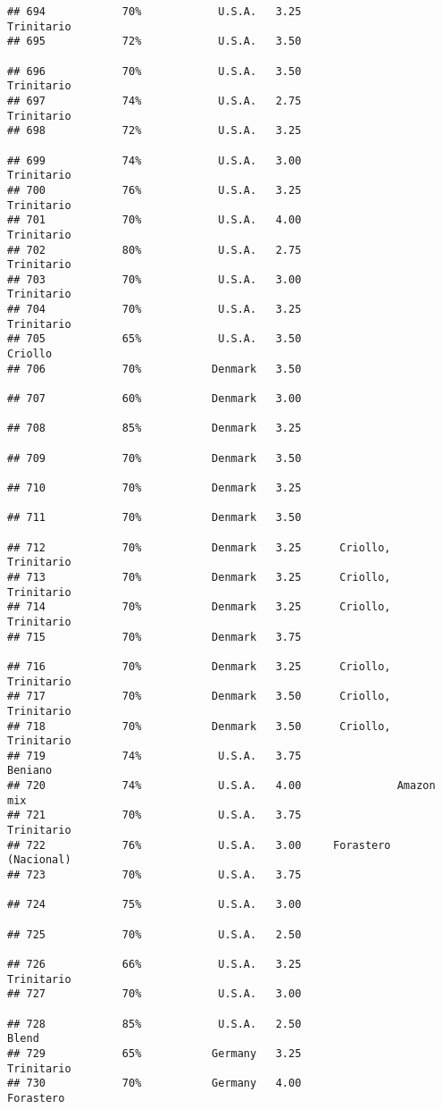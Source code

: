\documentclass[
]{article}
\begin{document}
\begin{verbatim}
## 694            70%            U.S.A.   3.25               Trinitario
## 695            72%            U.S.A.   3.50                         
## 696            70%            U.S.A.   3.50               Trinitario
## 697            74%            U.S.A.   2.75               Trinitario
## 698            72%            U.S.A.   3.25                         
## 699            74%            U.S.A.   3.00               Trinitario
## 700            76%            U.S.A.   3.25               Trinitario
## 701            70%            U.S.A.   4.00               Trinitario
## 702            80%            U.S.A.   2.75               Trinitario
## 703            70%            U.S.A.   3.00               Trinitario
## 704            70%            U.S.A.   3.25               Trinitario
## 705            65%            U.S.A.   3.50                  Criollo
## 706            70%           Denmark   3.50                         
## 707            60%           Denmark   3.00                         
## 708            85%           Denmark   3.25                         
## 709            70%           Denmark   3.50                         
## 710            70%           Denmark   3.25                         
## 711            70%           Denmark   3.50                         
## 712            70%           Denmark   3.25      Criollo, Trinitario
## 713            70%           Denmark   3.25      Criollo, Trinitario
## 714            70%           Denmark   3.25      Criollo, Trinitario
## 715            70%           Denmark   3.75                         
## 716            70%           Denmark   3.25      Criollo, Trinitario
## 717            70%           Denmark   3.50      Criollo, Trinitario
## 718            70%           Denmark   3.50      Criollo, Trinitario
## 719            74%            U.S.A.   3.75                  Beniano
## 720            74%            U.S.A.   4.00               Amazon mix
## 721            70%            U.S.A.   3.75               Trinitario
## 722            76%            U.S.A.   3.00     Forastero (Nacional)
## 723            70%            U.S.A.   3.75                         
## 724            75%            U.S.A.   3.00                         
## 725            70%            U.S.A.   2.50                         
## 726            66%            U.S.A.   3.25               Trinitario
## 727            70%            U.S.A.   3.00                         
## 728            85%            U.S.A.   2.50                    Blend
## 729            65%           Germany   3.25               Trinitario
## 730            70%           Germany   4.00                Forastero

\end{verbatim}
\end{document}
